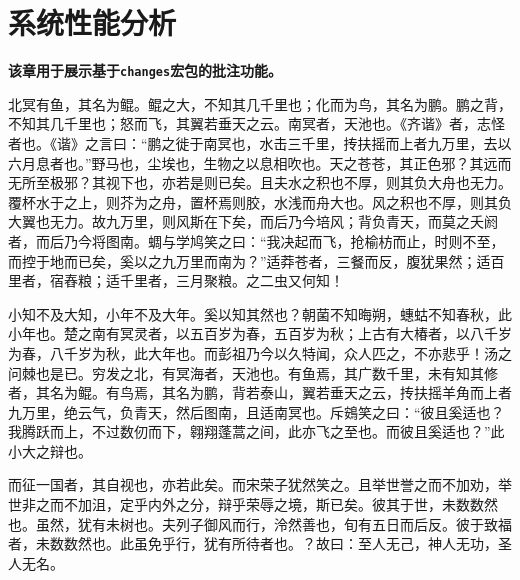 
\section{系统性能分析}

{\bf 该章用于展示基于\verb|changes|宏包的批注功能。}

北冥有鱼，其名为鲲。鲲之大，不知其几千里也；化而为鸟，其名为鹏。鹏之背，不知其几千里也；怒而飞，其翼若垂天之云。南冥者，天池也。《齐谐》者，志怪者也。《谐》之言曰：“鹏之徙于南冥也，水击三千里，抟扶摇而上者九万里，去以六月息者也。”野马也，尘埃也，生物之以息相吹也。天之苍苍，其正色邪？其远而无所至极邪？其视下也，亦若是则已矣。且夫水之积也不厚，则其负大舟也无力。覆杯水于之上，则芥为之舟，置杯焉则胶，水浅而舟大也。风之积也不厚，则其负大翼也无力。故九万里，则风斯在下矣，而后乃今培风；背负青天，而莫之夭阏者，而后乃今将图南。蜩与学鸠笑之曰：“我决起而飞，抢榆枋而止，时则不至，而控于地而已矣，奚以之九万里而南为？”适莽苍者，三餐而反，腹犹果然；适百里者，宿舂粮；适千里者，三月聚粮。之二虫又何知！

小知不及大知，小年不及大年。奚以知其然也？朝菌不知晦朔，蟪蛄不知春秋，此小年也。楚之南有冥灵者，以五百岁为春，五百岁为秋；上古有大椿者，以八千岁为春，八千岁为秋，此大年也。而彭祖乃今以久特闻，众人匹之，不亦悲乎！汤之问棘也是已。穷发之北，有冥海者，天池也。有鱼焉，其广数千里，未有知其修者，其名为鲲。有鸟焉，其名为鹏，背若泰山，翼若垂天之云，抟扶摇羊角而上者九万里，绝云气，负青天，然后图南，且适南冥也。斥鴳笑之曰：“彼且奚适也？我腾跃而上，不过数仞而下，翱翔蓬蒿之间，此亦飞之至也。而彼且奚适也？”此小大之辩也。

而征一国者，其自视也，亦若此矣。而宋荣子犹然笑之。且举世誉之而不加劝，举世非之而不加沮，定乎内外之分，辩乎荣辱之境，斯已矣。彼其于世，未数数然也。虽然，犹有未树也。夫列子御风而行，泠然善也，旬有五日而后反。彼于致福者，未数数然也。此虽免乎行，犹有所待者也。？故曰：至人无己，神人无功，圣人无名。

\iffalse
只能用这个命令
来实现多行注释
\fi
